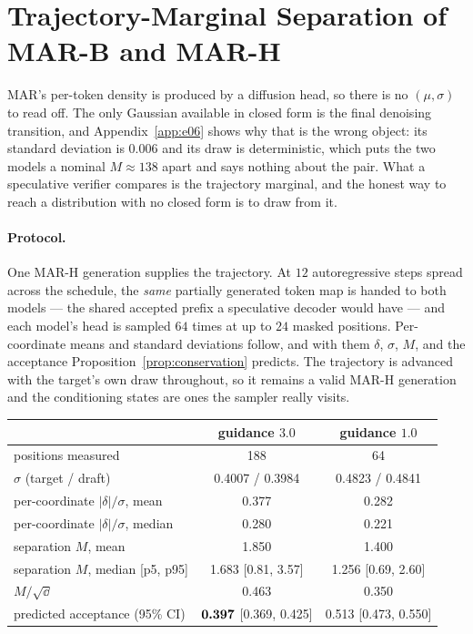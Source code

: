 \section{Trajectory-Marginal Separation of MAR-B and MAR-H}
\label{app:e07}

MAR's per-token density is produced by a diffusion head, so there is no $(\mu, \sigma)$ to read off.
The only Gaussian available in closed form is the final denoising transition, and
Appendix~\ref{app:e06} shows why that is the wrong object: its standard deviation is $0.006$ and its
draw is deterministic, which puts the two models a nominal $M \approx 138$ apart and says nothing
about the pair. What a speculative verifier compares is the trajectory marginal, and the honest way
to reach a distribution with no closed form is to draw from it.

\paragraph{Protocol.} One MAR-H generation supplies the trajectory. At $12$ autoregressive steps
spread across the schedule, the \emph{same} partially generated token map is handed to both models
--- the shared accepted prefix a speculative decoder would have --- and each model's head is sampled
$64$ times at up to $24$ masked positions. Per-coordinate means and standard deviations follow, and
with them $\delta$, $\sigma$, $M$, and the acceptance Proposition~\ref{prop:conservation} predicts.
The trajectory is advanced with the target's own draw throughout, so it remains a valid MAR-H
generation and the conditioning states are ones the sampler really visits.

\begin{center}
\small
\begin{tabular}{lcc}
\toprule
& guidance $3.0$ & guidance $1.0$ \\
\midrule
positions measured                    & 188 & 64 \\
$\sigma$ (target / draft)             & 0.4007 / 0.3984 & 0.4823 / 0.4841 \\
per-coordinate $|\delta|/\sigma$, mean & 0.377 & 0.282 \\
per-coordinate $|\delta|/\sigma$, median & 0.280 & 0.221 \\
separation $M$, mean                  & 1.850 & 1.400 \\
separation $M$, median [p5, p95]      & 1.683 [0.81, 3.57] & 1.256 [0.69, 2.60] \\
$M/\sqrt{\dd}$                        & 0.463 & 0.350 \\
predicted acceptance (95\% CI)        & $\bm{0.397}$ [0.369, 0.425] & 0.513 [0.473, 0.550] \\
\bottomrule
\end{tabular}
\end{center}

